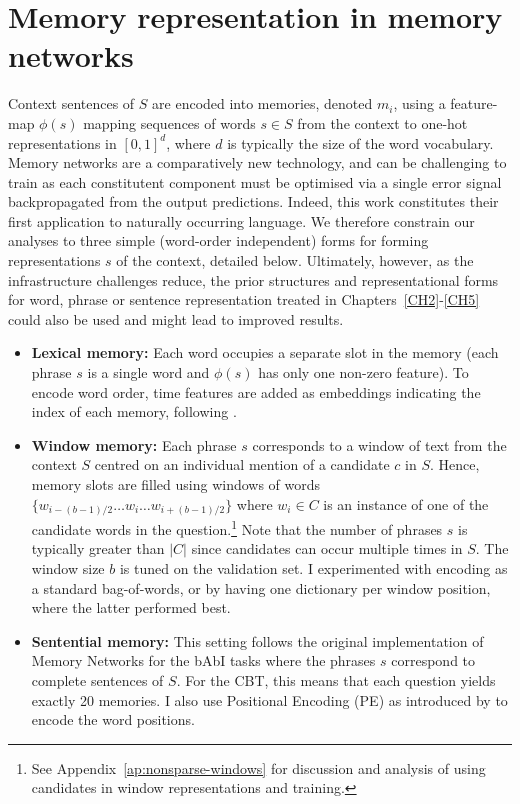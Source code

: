 \section{Memory representation in memory networks}

\label{sec:memnn}

Context sentences of $S$ are encoded into memories, denoted $m_i$, using a feature-map \(\phi(s)\) mapping sequences of words \(s \in S\) from the context to one-hot representations in \([0,1]^d\), where $d$ is typically the size of the word vocabulary. Memory networks are a comparatively new technology, and can be challenging to train as each constitutent component must be optimised via a single error signal backpropagated from the output predictions. Indeed, this work constitutes their first application to naturally occurring language. We therefore constrain our analyses to three simple (word-order independent) forms for forming representations \(s\) of the context, detailed below. Ultimately, however, as the infrastructure challenges reduce, the prior structures and representational forms for word, phrase or sentence representation treated in Chapters~\ref{CH2}-\ref{CH5} could also be used and might lead to improved results.

\begin{itemize}  %

\item {\bf Lexical memory:} Each word occupies a separate slot in the memory (each phrase \(s\) is a single word and \(\phi(s)\) has only one non-zero feature). To encode word order, time features are added as embeddings indicating the index of each memory, following \cite{sukhbaatar2015end}. 

\item {\bf Window memory:} Each phrase \(s\) corresponds to a window of text from the context $S$ centred on an individual mention of a candidate $c$ in $S$. Hence, memory slots are filled using windows of words \(\{ w_{i-(b-1)/2} \dots w_i \dots w_{i+(b-1)/2} \} \) where \(w_i\in C\) is an instance of one of the candidate words in the question.\footnote{See Appendix~\ref{ap:nonsparse-windows} for discussion and analysis of using candidates in window representations and training.} Note that the number of phrases \(s\) is typically greater than $|C|$ since candidates can occur multiple times in $S$. The window size \(b\) is tuned on the validation set. I experimented with encoding as a standard bag-of-words, or by having one dictionary per window position, where the latter performed best.

\item {\bf Sentential memory:} This setting follows the original implementation of Memory Networks for the bAbI tasks where the phrases \(s\) correspond to complete sentences of $S$.  For the CBT, this means that each question yields exactly 20 memories. I also use Positional Encoding (PE) as introduced by \cite{sukhbaatar2015end} to encode the word positions. 
\end{itemize}

